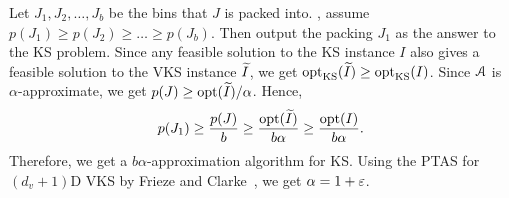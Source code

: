 Let $J_1, J_2, \ldots, J_b$ be the bins that $J$ is packed into.
\WLoG, assume $p(J_1) \ge p(J_2) \ge \ldots \ge p(J_b)$. Then output the packing $J_1$
as the answer to the  KS problem.
Since any feasible solution to the  KS instance $I$ also gives a
feasible solution to the VKS instance $\widetilde{I}$, we get
$\operatorname{opt}_{\mathrm{KS}}(\widetilde{I}) \ge \operatorname{opt}_{\mathrm{KS}}(I)$.
Since $\mathcal{A}$ is $\alpha$-approximate, we get $p(J) \ge \operatorname{opt}(\widetilde{I})/\alpha$. Hence,
\[ p(J_1) \ge \frac{p(J)}{b}
\ge \frac{\operatorname{opt}(\widetilde{I})}{b\alpha}
\ge \frac{\operatorname{opt}(I)}{b\alpha}. \]
Therefore, we get a $b\alpha$-approximation algorithm for  KS.
Using the PTAS for $(d_v+1)$D VKS by Frieze and Clarke~\cite{frieze1984approximation},
we get $\alpha = 1+\varepsilon$.
